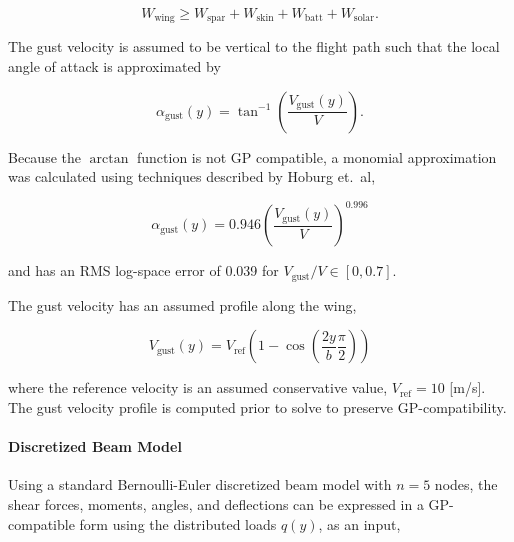 \begin{equation}
    W_{\text{wing}} \geq W_{\text{spar}} + W_{\text{skin}} + W_{\text{batt}} + W_{\text{solar}}.
\end{equation}

The gust velocity is assumed to be vertical to the flight path such that the local angle of attack is approximated by 

\begin{equation}
    \label{e:gustalpha}
    \alpha_{\text{gust}}(y)  = \tan^{-1}\left(\frac{V_{\text{gust}}(y)}{V} \right).
\end{equation}

Because the $\arctan$ function is not GP compatible, a monomial approximation was calculated using techniques described by Hoburg et.~al\cite{fitting},

\begin{equation}
    \alpha_{\text{gust}}(y)  = 0.946 \left(\frac{V_{\text{gust}}(y)}{V} \right)^{0.996}
\end{equation}

and has an RMS log-space error of 0.039 for $V_{\text{gust}}/V \in [0, 0.7]$.

The gust velocity has an assumed profile along the wing\cite{acgust},

\begin{equation}
    \label{e:gustwind}
    V_{\text{gust}}(y) = V_{\text{ref}} \left(1-\cos\left(\frac{2y}{b} \frac{\pi}{2} \right) \right)
\end{equation}

where the reference velocity is an assumed conservative value\cite{acgust}, $V_{\text{ref}} = 10$ [m/s]. The gust velocity profile is computed prior to solve to preserve GP-compatibility.

\paragraph{\textbf{Discretized Beam Model}} 

Using a standard Bernoulli-Euler discretized beam model with $n=5$ nodes\cite{bending}, the shear forces, moments, angles, and deflections can be expressed in a GP-compatible form using the distributed loads $q(y)$, as an input,


